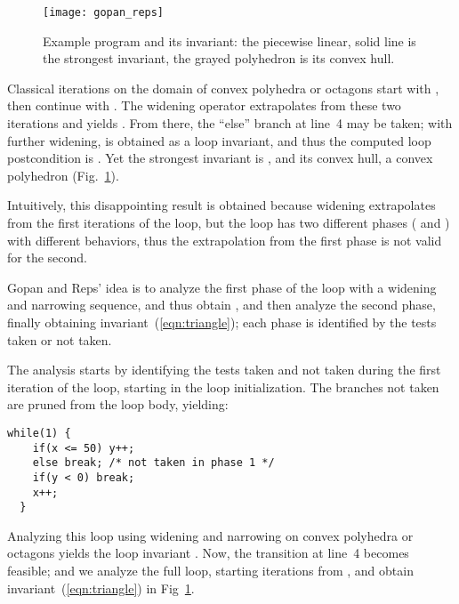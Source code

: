 \begin{figure}
  \begin{minipage}{.3\linewidth}
    
  \end{minipage}
\hfill
\begin{minipage}{.5\linewidth}
\texttt{[image: gopan\_reps]}

\end{minipage}
\caption{Example program and its invariant: the piecewise linear, solid line is the strongest invariant, the grayed polyhedron is its convex hull.}
\label{fig:gopan_reps_invariant} 
\end{figure}

Classical iterations on the domain of convex polyhedra \cite{CousotHalbwachs78,BagnaraHRZ05SCP} or octagons \cite{DBLP:journals/lisp/Mine06} start with , then continue with .
The widening operator extrapolates from these two iterations and yields .
From there, the ``else'' branch at line~4 may be taken; with further widening,  is obtained as a loop invariant, and thus the computed loop postcondition is .
Yet the strongest invariant is , and its convex hull, a convex polyhedron (Fig.~\ref{fig:gopan_reps_invariant}).

Intuitively, this disappointing result is obtained because widening extrapolates from the first iterations of the loop, but the loop has two different phases ( and ) with different behaviors, thus the extrapolation from the first phase is not valid for the second.

Gopan and Reps' idea is to analyze the first phase of the loop with a widening and narrowing sequence, and thus obtain , and then analyze the second phase, finally obtaining invariant~(\ref{eqn:triangle}); each phase is identified by the tests taken or not taken.

The analysis starts by identifying the tests taken and not taken during the first iteration of the loop, starting in the loop initialization. The branches not taken are pruned from the loop body, yielding:
\begin{lstlisting}[numbers=none]
  while(1) {
    if(x <= 50) y++;
    else break; /* not taken in phase 1 */
    if(y < 0) break;
    x++;
  }
\end{lstlisting}

Analyzing this loop using widening and narrowing on convex polyhedra
or octagons yields the loop invariant .
Now, the transition at line~4 becomes feasible; and we analyze the
full loop, starting iterations from ,
and obtain invariant~(\ref{eqn:triangle}) in Fig~\ref{fig:gopan_reps_invariant}.

